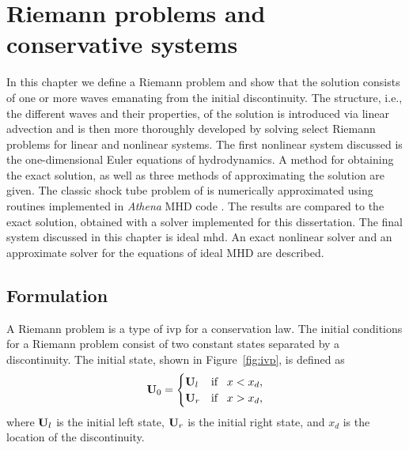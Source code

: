 %
%


\chapter[Riemann problems and conservative systems]{Riemann problems and conservative systems}
\label{chp:riemann}

In this chapter we define a Riemann problem and show that the solution consists of one or more waves emanating from the initial discontinuity.  The structure, i.e., the different waves and their properties, of the solution is introduced via linear advection and is then more thoroughly developed by solving select Riemann problems for linear and nonlinear systems.  The first nonlinear system discussed is the one-dimensional Euler equations of hydrodynamics.  A method for obtaining the exact solution, as well as three methods of approximating the solution are given.  The classic shock tube problem of \citet{Sod:1978} is numerically approximated using routines implemented in \emph{Athena} MHD code \citep{Stone:2008,url:athena}.  The results are compared to the exact solution, obtained with a solver implemented for this dissertation.  The final system discussed in this chapter is ideal \gls{mhd}.  An exact nonlinear solver and an approximate solver for the equations of ideal MHD are described. 

\section[Formulation]{Formulation}
\label{sec:formulation}

A Riemann problem is a type of \gls{ivp} for a conservation law.  The initial conditions for a Riemann problem consist of two constant states separated by a discontinuity.  The initial state, shown in Figure~\ref{fig:ivp}, is defined as
\begin{gather}
\label{eqn:ivp} 
\mathbf{U}_0 = 
\begin{cases}
\mathbf{U}_l & \text{if}\;\;\; x < x_d, \\
\mathbf{U}_r & \text{if}\;\;\; x > x_d, \\
\end{cases}
\end{gather} 
where $\mathbf{U}_l$ is the initial left state, $\mathbf{U}_r$ is the initial right state, and $x_d$ is the location of the discontinuity.

